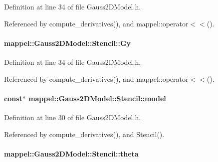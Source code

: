 Definition at line 34 of file Gauss2\+D\+Model.\+h.



Referenced by compute\+\_\+derivatives(), and mappel\+::operator$<$$<$().

\paragraph[{\texorpdfstring{Gy}{Gy}}]{ mappel\+::\+Gauss2\+D\+Model\+::\+Stencil\+::\+Gy}\hypertarget{classmappel_1_1Gauss2DModel_1_1Stencil_abe22fdce34e3532fd33aa169aa68de56}{}\label{classmappel_1_1Gauss2DModel_1_1Stencil_abe22fdce34e3532fd33aa169aa68de56}


Definition at line 34 of file Gauss2\+D\+Model.\+h.



Referenced by compute\+\_\+derivatives(), and mappel\+::operator$<$$<$().

\paragraph[{\texorpdfstring{model}{model}}]{ const$\ast$ mappel\+::\+Gauss2\+D\+Model\+::\+Stencil\+::model}\hypertarget{classmappel_1_1Gauss2DModel_1_1Stencil_ac5ae33e358a883887bccedc8a485bca7}{}\label{classmappel_1_1Gauss2DModel_1_1Stencil_ac5ae33e358a883887bccedc8a485bca7}


Definition at line 30 of file Gauss2\+D\+Model.\+h.



Referenced by compute\+\_\+derivatives(), and Stencil().

\paragraph[{\texorpdfstring{theta}{theta}}]{ mappel\+::\+Gauss2\+D\+Model\+::\+Stencil\+::theta}\hypertarget{classmappel_1_1Gauss2DModel_1_1Stencil_ac9ce60b33fe2235ebbb80dd9d90a49ad}{}\label{classmappel_1_1Gauss2DModel_1_1Stencil_ac9ce60b33fe2235ebbb80dd9d90a49ad}


